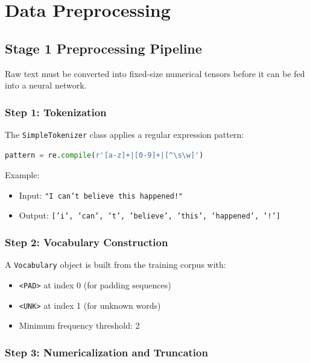 \documentclass[12pt, a4paper]{report}
\begin{document}
\chapter{Data Preprocessing}

\section{Stage 1 Preprocessing Pipeline}

Raw text must be converted into fixed-size numerical tensors before it can be fed into a neural network.

\subsection{Step 1: Tokenization}

The \texttt{SimpleTokenizer} class applies a regular expression pattern:

\begin{lstlisting}[language=Python]
pattern = re.compile(r'[a-z]+|[0-9]+|[^\s\w]')
\end{lstlisting}

Example:
\begin{itemize}
    \item Input: \texttt{"I can't believe this happened!"}
    \item Output: \texttt{['i', 'can', 't', 'believe', 'this', 'happened', '!']}
\end{itemize}

\subsection{Step 2: Vocabulary Construction}

A \texttt{Vocabulary} object is built from the training corpus with:
\begin{itemize}
    \item \texttt{<PAD>} at index 0 (for padding sequences)
    \item \texttt{<UNK>} at index 1 (for unknown words)
    \item Minimum frequency threshold: 2
\end{itemize}

\subsection{Step 3: Numericalization and Truncation}
\end{document}
